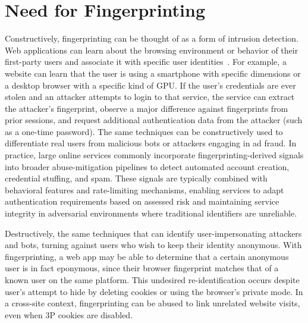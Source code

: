 \section{Need for Fingerprinting}
\label{sec:need-for-fingerprinting}

Constructively, fingerprinting can be thought of as a form of intrusion detection. 
%
Web applications can learn about the browsing environment or behavior of their first-party users and associate it with specific user identities~\cite{LinPhishSheepsClothing2022}. 
%
For example, a website can learn that the user is using a smartphone with specific dimensions or a desktop browser with a specific kind of GPU. 
%
If the user's credentials are ever stolen and an attacker attempts to login to that service, the service can extract the attacker's fingerprint, observe a major difference against fingerprints from prior sessions, and request additional authentication data from the attacker (such as a one-time password).
%
The same techniques can be constructively used to differentiate real users from malicious bots or attackers engaging in ad fraud.
%
In practice, large online services commonly incorporate fingerprinting-derived signals into broader abuse-mitigation pipelines to detect automated account creation, credential stuffing, and spam. 
%
These signals are typically combined with behavioral features and rate-limiting mechanisms, enabling services to adapt authentication requirements based on assessed risk and maintaining service integrity in adversarial environments where traditional identifiers are unreliable.

Destructively, the same techniques that can identify user-impersonating attackers and bots, turning against users who wish to keep their identity anonymous. 
%
With fingerprinting, a web app may be able to determine that a certain anonymous user is in fact eponymous, since their browser fingerprint matches that of a known user on the same platform. 
%
This undesired re-identification occurs despite user's attempt to hide by deleting cookies or using the browser's private mode. 
%
In a cross-site context, fingerprinting can be abused to link unrelated website visits, even when 3P cookies are disabled.



